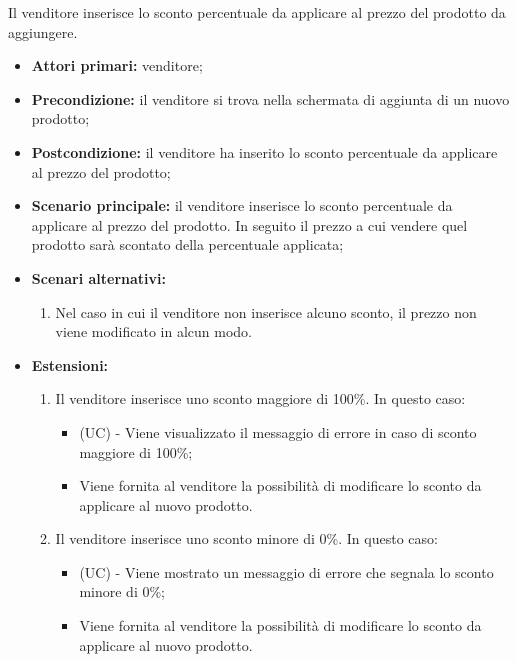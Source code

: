 Il venditore inserisce lo sconto percentuale da applicare al prezzo del prodotto da aggiungere.
\begin{itemize}
    \item \textbf{Attori primari:} venditore;
    \item \textbf{Precondizione:} il venditore si trova nella schermata di aggiunta di un nuovo prodotto;
    \item \textbf{Postcondizione:} il venditore ha inserito lo sconto percentuale da applicare al prezzo del prodotto;
    \item \textbf{Scenario principale:} il venditore inserisce lo sconto percentuale da applicare al prezzo del prodotto. In seguito il prezzo a cui vendere quel prodotto sarà scontato della percentuale applicata;
    \item \textbf{Scenari alternativi:}
    \begin{enumerate}[label=\lett]
    	\item Nel caso in cui il venditore non inserisce alcuno sconto, il prezzo non viene modificato in alcun modo.
    \end{enumerate}
    \item \textbf{Estensioni:}
    \begin{enumerate}[label=\lett]
    	\item Il venditore inserisce uno sconto maggiore di 100\%. In questo caso:
    	\begin{itemize}
    		\item (UC) - Viene visualizzato il messaggio di errore in caso di sconto maggiore di 100\%;
    		\item Viene fornita al venditore la possibilità di modificare lo sconto da applicare al nuovo prodotto.
    	\end{itemize}
    	\item Il venditore inserisce uno sconto minore di 0\%. In questo caso:
    	\begin{itemize}
    		\item (UC) - Viene mostrato un messaggio di errore che segnala lo sconto minore di 0\%;
    		\item Viene fornita al venditore la possibilità di modificare lo sconto da applicare al nuovo prodotto.
    	\end{itemize}
    \end{enumerate}
\end{itemize}

